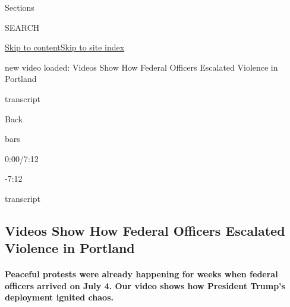 Sections

SEARCH

\protect\hyperlink{site-content}{Skip to
content}\protect\hyperlink{site-index}{Skip to site index}

new video loaded: Videos Show How Federal Officers Escalated Violence in
Portland

transcript

Back

bars

0:00/7:12

-7:12

transcript

\hypertarget{videos-show-how-federal-officers-escalated-violence-in-portland}{%
\subsection{Videos Show How Federal Officers Escalated Violence in
Portland}\label{videos-show-how-federal-officers-escalated-violence-in-portland}}

\hypertarget{peaceful-protests-were-already-happening-for-weeks-when-federal-officers-arrived-on-july-4-our-video-shows-how-president-trumps-deployment-ignited-chaos}{%
\paragraph{Peaceful protests were already happening for weeks when
federal officers arrived on July 4. Our video shows how President
Trump's deployment ignited
chaos.}\label{peaceful-protests-were-already-happening-for-weeks-when-federal-officers-arrived-on-july-4-our-video-shows-how-president-trumps-deployment-ignited-chaos}}

